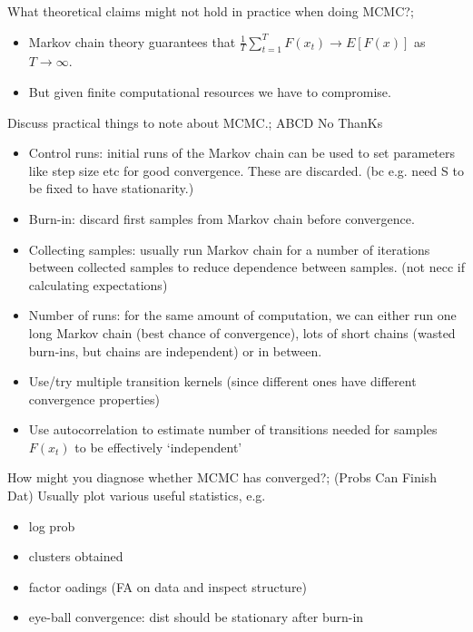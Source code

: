 \documentclass{article}
\begin{document}
What theoretical claims might not hold in practice when doing MCMC?; \begin{itemize} \item Markov chain theory guarantees that $\frac{1}{T}\sum_{t=1}^T F(x_t)\rightarrow E[F(x)]$ as $T\rightarrow \infty$. \item But given finite computational resources we have to compromise. \end{itemize}

Discuss practical things to note about MCMC.; ABCD No ThanKs\begin{itemize} \item Control runs: initial runs of the Markov chain can be used to set parameters like step size etc for good convergence. These are discarded. (bc e.g. need S to be fixed to have stationarity.) \item Burn-in: discard first samples from Markov chain before convergence. \item Collecting samples: usually run Markov chain for a number of iterations between collected samples to reduce dependence between samples. (not necc if calculating expectations) \item Number of runs: for the same amount of computation, we can either run one long Markov chain (best chance of convergence), lots of short chains (wasted burn-ins, but chains are independent) or in between. \item Use/try multiple transition kernels (since different ones have different convergence properties) \item Use autocorrelation to estimate number of transitions needed for samples $F(x_t)$ to be effectively `independent' \end{itemize}

How might you diagnose whether MCMC has converged?; (Probs Can Finish Dat) Usually plot various useful statistics, e.g. \begin{itemize} \item log prob \item clusters obtained \item factor oadings (FA on data and inspect structure) \item eye-ball convergence: dist should be stationary after burn-in \end{itemize}
\end{document}
